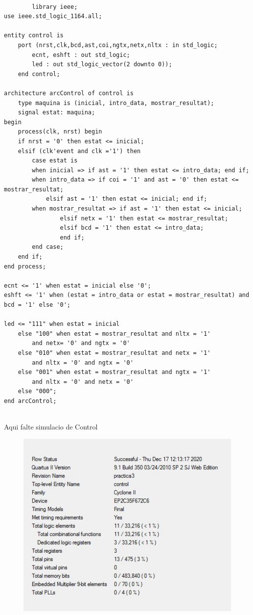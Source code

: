 \documentclass[12pt, a4papre]{article}
\begin{document}
		\begin{lstlisting}[style=vhdl, frame=single, basicstyle=\tiny]
		
		library ieee;
use ieee.std_logic_1164.all;

entity control is
	port (nrst,clk,bcd,ast,coi,ngtx,netx,nltx : in std_logic;
		ecnt, eshft : out std_logic;
		led : out std_logic_vector(2 downto 0));
	end control;

architecture arcControl of control is 
	type maquina is (inicial, intro_data, mostrar_resultat);
	signal estat: maquina;
begin
	process(clk, nrst) begin
	if nrst = '0' then estat <= inicial;
	elsif (clk'event and clk ='1') then
	    case estat is 
	    when inicial => if ast = '1' then estat <= intro_data; end if;
	    when intro_data => if coi = '1' and ast = '0' then estat <= mostrar_resultat;
			elsif ast = '1' then estat <= inicial; end if;
	    when mostrar_resultat => if ast = '1' then estat <= inicial;
				elsif netx = '1' then estat <= mostrar_resultat;
				elsif bcd = '1' then estat <= intro_data;
				end if;
	    end case;
	end if;
end process;

ecnt <= '1' when estat = inicial else '0';
eshft <= '1' when (estat = intro_data or estat = mostrar_resultat) and bcd = '1' else '0';
			
led <= "111" when estat = inicial 
    else "100" when estat = mostrar_resultat and nltx = '1' 
        and netx= '0' and ngtx = '0'
    else "010" when estat = mostrar_resultat and netx = '1' 
    	and nltx = '0' and ngtx = '0'
    else "001" when estat = mostrar_resultat and ngtx = '1' 
    	and nltx = '0' and netx = '0'
    else "000";
end arcControl;
		
		\end{lstlisting}
		
		Aqui falte simulacio de Control 

	
	
	\begin{figure}[H]
		\begin{center}
		\includegraphics[width=130mm]{informeControl.jpeg}
		\end{center}
	\end{figure}	
		
\end{document}
